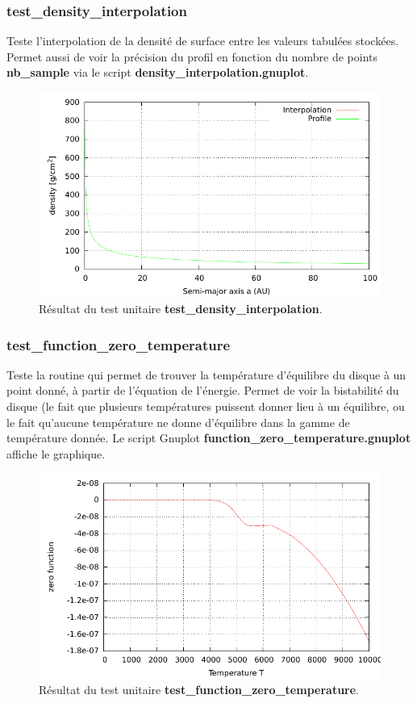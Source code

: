 \subsubsection{test\_density\_interpolation}
Teste l'interpolation de la densité de surface entre les valeurs tabulées stockées. Permet aussi de voir la précision du profil en fonction du nombre de points \textbf{nb\_sample} via le script \textbf{density\_interpolation.gnuplot}.

\begin{figure}[htbp]
\centering
\includegraphics[width=0.65\linewidth]{figure/unitary_tests/density_interpolation.pdf}
\caption{Résultat du test unitaire \textbf{test\_density\_interpolation}.}
\end{figure}

\subsubsection{test\_function\_zero\_temperature}
Teste la routine qui permet de trouver la température d'équilibre du disque à un point donné, à partir de l'équation de l'énergie. Permet de voir la bistabilité du disque (le fait que plusieurs températures puissent donner lieu à un équilibre, ou le fait qu'aucune température ne donne d'équilibre dans la gamme de température donnée. Le script Gnuplot \textbf{function\_zero\_temperature.gnuplot} affiche le graphique.

\begin{figure}[htbp]
\centering
\includegraphics[width=0.65\linewidth]{figure/unitary_tests/function_zero_temperature.pdf}
\caption{Résultat du test unitaire \textbf{test\_function\_zero\_temperature}.}
\end{figure}

